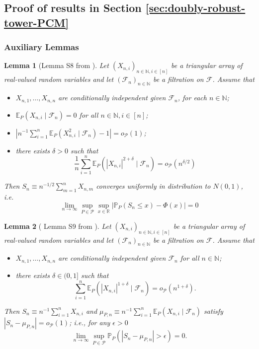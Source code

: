 \documentclass[12pt]{article}
\newtheorem{lemma}{Lemma}
\theoremstyle{definition}
\theoremstyle{remark}
\begin{document}
\subsection{Proof of results in Section \ref{sec:doubly-robust-tower-PCM}}
\subsubsection{Auxiliary Lemmas}
\begin{lemma}[Lemma S8 from \citep{Lundborg2022a}]\label{lemma:S8}
	Let $\left(X_{n, i}\right)_{n \in \mathbb{N}, i \in[n]}$ be a triangular array of real-valued random variables and let $\left(\mathcal{F}_n\right)_{n \in \mathbb{N}}$ be a filtration on $\mathcal{F}$. Assume that
	\begin{itemize}
		\item[(i)] $X_{n, 1}, \ldots, X_{n, n}$ are conditionally independent given $\mathcal{F}_n$, for each $n \in \mathbb{N}$;
		\item[(ii)] $\mathbb{E}_P\left(X_{n, i} \mid \mathcal{F}_n\right)=0$ for all $n \in \mathbb{N}, i \in[n]$;
		\item[(iii)] $\left|n^{-1} \sum_{i=1}^n \mathbb{E}_P\left(X_{n, i}^2 \mid \mathcal{F}_n\right)-1\right|=o_{\mathcal{P}}(1)$;
		\item[(iv)] there exists $\delta>0$ such that
		$$
		\frac{1}{n} \sum_{i=1}^n \mathbb{E}_P\left(\left|X_{n, i}\right|^{2+\delta} \mid \mathcal{F}_n\right)=o_{\mathcal{P}}\left(n^{\delta / 2}\right)
		$$
	\end{itemize}
	Then $S_n \equiv n^{-1 / 2} \sum_{m=1}^n X_{n, m}$ converges uniformly in distribution to $N(0,1)$, i.e.
	$$
	\lim _{n \rightarrow \infty} \sup _{P \in \mathcal{P}} \sup _{x \in \mathbb{R}}\left|\mathbb{P}_P\left(S_n \leq x\right)-\Phi(x)\right|=0
	$$
\end{lemma}
\begin{lemma}[ Lemma S9 from \citep{Lundborg2022a}] \label{lemma:S9}
	Let $\left(X_{n, i}\right)_{n \in \mathbb{N}, i \in[n]}$ be a triangular array of real-valued random variables and let $\left(\mathcal{F}_n\right)_{n \in \mathbb{N}}$ be a filtration on $\mathcal{F}$. Assume that
	\begin{itemize}
		\item[(i)]$X_{n, 1}, \ldots, X_{n, n}$ are conditionally independent given $\mathcal{F}_n$ for all $n \in \mathbb{N}$;
		\item[(ii)] there exists $\delta \in(0,1]$ such that
		$$
		\sum_{i=1}^n \mathbb{E}_P\left(\left|X_{n, i}\right|^{1+\delta} \mid \mathcal{F}_n\right)=o_{\mathcal{P}}\left(n^{1+\delta}\right) .
		$$  	
	\end{itemize}
	Then $S_n \equiv n^{-1} \sum_{i=1}^n X_{n, i}$ and $\mu_{P, n} \equiv n^{-1} \sum_{i=1}^n \mathbb{E}_P\left(X_{n, i} \mid \mathcal{F}_n\right)$ satisfy $\left|S_n-\mu_{P, n}\right|=o_{\mathcal{P}}(1)$; i.e., for any $\epsilon>0$
	$$
	\lim _{n \rightarrow \infty} \sup _{P \in \mathcal{P}} \mathbb{P}_P\left(\left|S_n-\mu_{P, n}\right|>\epsilon\right)=0 .
	$$
\end{lemma}	
\end{document}
